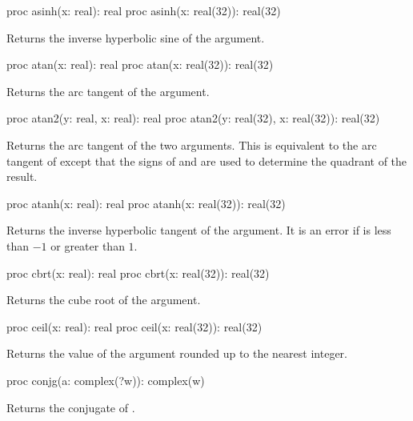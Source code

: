 \begin{protohead}
proc asinh(x: real): real
proc asinh(x: real(32)): real(32)
\end{protohead}
\begin{protobody}
Returns the inverse hyperbolic sine of the argument.
\end{protobody}

\begin{protohead}
proc atan(x: real): real
proc atan(x: real(32)): real(32)
\end{protohead}
\begin{protobody}
Returns the arc tangent of the argument.
\end{protobody}

\begin{protohead}
proc atan2(y: real, x: real): real
proc atan2(y: real(32), x: real(32)): real(32)
\end{protohead}
\begin{protobody}
Returns the arc tangent of the two arguments.  This is equivalent to
the arc tangent of  except that the signs of 
and  are used to determine the quadrant of the result.
\end{protobody}

\begin{protohead}
proc atanh(x: real): real
proc atanh(x: real(32)): real(32)
\end{protohead}
\begin{protobody}
Returns the inverse hyperbolic tangent of the argument.  It is an error
if  is less than $-1$ or greater than $1$.
\end{protobody}

\begin{protohead}
proc cbrt(x: real): real
proc cbrt(x: real(32)): real(32)
\end{protohead}
\begin{protobody}
Returns the cube root of the argument.
\end{protobody}

\begin{protohead}
proc ceil(x: real): real
proc ceil(x: real(32)): real(32)
\end{protohead}
\begin{protobody}
Returns the value of the argument rounded up to the nearest integer.
\end{protobody}

\begin{protohead}
proc conjg(a: complex(?w)): complex(w)
\end{protohead}
\begin{protobody}
Returns the conjugate of .
\end{protobody}

